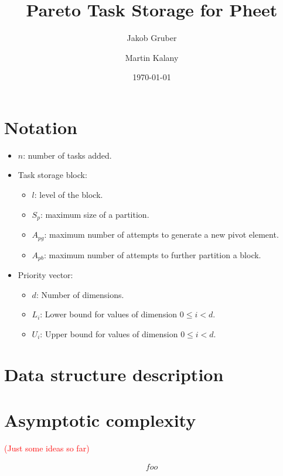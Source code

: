 \documentclass[a4paper,12pt]{article}
\newcommand\todo[1]{\textcolor{red}{(#1)}}
\newcommand\pdim{d}
\newcommand\Li{L_{i}}
\newcommand\Ui{U_{i}}
\newcommand\mps{S_p}
\newcommand\apg{A_{pg}}
\newcommand\apb{A_{pb}}
\newcommand\lvl{l}
\begin{document}
\title{Pareto Task Storage for Pheet}
\author{
Jakob Gruber
\and
Martin Kalany
}
\date{\today}

\maketitle

\section{Notation}\label{sec:notation}
\begin{itemize}
\item $n$: number of tasks added.
\item Task storage block:
	\begin{itemize}
	\item $\lvl$: level of the block.
	\item $\mps$: maximum size of a partition.
	\item $\apg$: maximum number of attempts to generate a new pivot element.
	\item $\apb$: maximum number of attempts to further partition a block.
	\end{itemize}
\item Priority vector:
	\begin{itemize}
	\item $\pdim$: Number of dimensions.
	\item $\Li$: Lower bound for values of dimension $0 \leq i < d$.
	\item $\Ui$: Upper bound for values of dimension $0 \leq i < d$.	
	\end{itemize}
\end{itemize}

\section{Data structure description}\label{sec:ds}


\section{Asymptotic complexity}\label{sec:complexity}
\todo{Just some ideas so far}

\begin{align*}
foo
\end{align*}
\end{document}
